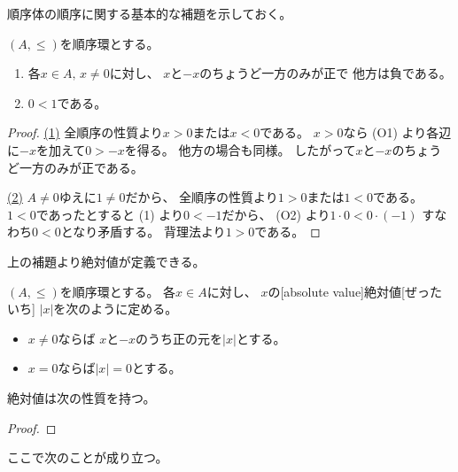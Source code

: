 \documentclass[report]{jlreq}
\begin{document}
順序体の順序に関する基本的な補題を示しておく。

\begin{lemma}
    $(A, \le)$を順序環とする。
    \begin{enumerate}
        \item 各$x \in A, \, x \neq 0$に対し、
            $x$と$-x$のちょうど一方のみが正で
            他方は負である。
        \item $0 < 1$である。
    \end{enumerate}
\end{lemma}

\begin{proof}
    \uline{(1)} \quad
    全順序の性質より$x > 0$または$x < 0$である。
    $x > 0$なら (O1) より各辺に$-x$を加えて$0 > -x$を得る。
    他方の場合も同様。
    したがって$x$と$-x$のちょうど一方のみが正である。

    \uline{(2)} \quad
    $A \neq 0$ゆえに$1 \neq 0$だから、
    全順序の性質より$1 > 0$または$1 < 0$である。
    $1 < 0$であったとすると
    (1) より$0 < -1$だから、
    (O2) より$1 \cdot 0 < 0 \cdot (-1)$
    すなわち$0 < 0$となり矛盾する。
    背理法より$1 > 0$である。
\end{proof}

上の補題より絶対値が定義できる。

\begin{definition}[絶対値]
    $(A, \le)$を順序環とする。
    各$x \in A$に対し、
    $x$の[absolute value]{絶対値}[ぜったいち]
    $|x|$を次のように定める。
    \begin{itemize}
        \item $x \neq 0$ならば
            $x$と$-x$のうち正の元を$|x|$とする。
        \item $x = 0$ならば$|x| = 0$とする。
    \end{itemize}
\end{definition}

絶対値は次の性質を持つ。

\begin{proposition}[絶対値の基本性質]
    \TODO{}
\end{proposition}

\begin{proof}
    \TODO{}
\end{proof}

ここで次のことが成り立つ。

\end{document}
